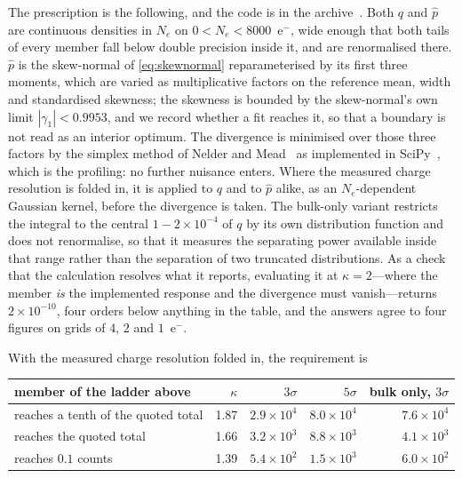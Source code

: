 \documentclass[11pt,a4paper]{article}
\begin{document}
The prescription is the following, and the code is in the
archive~\cite{Archive}. Both \(q\) and \(\hat p\) are continuous
densities in \(N_e\) on \(0<N_e<8000\)~e\(^-\), wide enough that both
tails of every member fall below double precision inside it, and are
renormalised there. \(\hat p\) is the skew-normal of
\cref{eq:skewnormal} reparameterised by its first three moments, which
are varied as multiplicative factors on the reference mean, width and
standardised skewness; the skewness is bounded by the skew-normal's own
limit \(|\gamma_1|<0.9953\), and we record whether a fit reaches it, so
that a boundary is not read as an interior optimum. The divergence is
minimised over those three factors by the simplex method of Nelder and
Mead~\cite{NelderMead} as implemented in SciPy~\cite{SciPy}, which is the
profiling: no further nuisance enters. Where the measured charge
resolution is folded in, it is applied to \(q\) and to \(\hat p\) alike,
as an \(N_e\)-dependent Gaussian kernel, before the divergence is taken.
The bulk-only variant restricts the integral to the central
\(1-2\times10^{-4}\) of \(q\) by its own distribution function and does
not renormalise, so that it measures the separating power available
inside that range rather than the separation of two truncated
distributions. As a check that the calculation resolves what it reports,
evaluating it at \(\kappa=2\)---where the member \emph{is} the
implemented response and the divergence must vanish---returns
\(2\times10^{-10}\), four orders below anything in the table, and the
answers agree to four figures on grids of \(4\), \(2\) and
\(1\)~e\(^-\).

With the measured charge resolution folded in, the requirement is

\begin{center}
\begin{tabular}{lrrrr}
\toprule
member of the ladder above & \(\kappa\) & \(3\sigma\) & \(5\sigma\) & bulk only, \(3\sigma\)\\
\midrule
reaches a tenth of the quoted total & 1.87 & \(2.9\times10^{4}\) & \(8.0\times10^{4}\) & \(7.6\times10^{4}\)\\
reaches the quoted total            & 1.66 & \(3.2\times10^{3}\) & \(8.8\times10^{3}\) & \(4.1\times10^{3}\)\\
reaches \(0.1\) counts              & 1.39 & \(5.4\times10^{2}\) & \(1.5\times10^{3}\) & \(6.0\times10^{2}\)\\
\bottomrule
\end{tabular}
\end{center}
\end{document}
